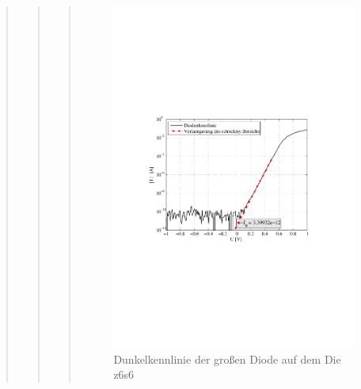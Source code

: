 \begin{quote}
\begin{quote}
\begin{quote}
            \begin{figure}[H]
                \centering
                \includegraphics[scale=0.7, trim = 3.1cm 9.2cm 4cm 8.5cm, clip]{KennlinienBilder/dunkel_kennlinie_z6_s6.pdf}
                \caption{Dunkelkennlinie der großen Diode auf dem Die z6s6}
                \label{fig:dunkel_kennlinie_z6_s6.pdf}
            \end{figure}



\end{quote}
\end{quote}
\end{quote}
